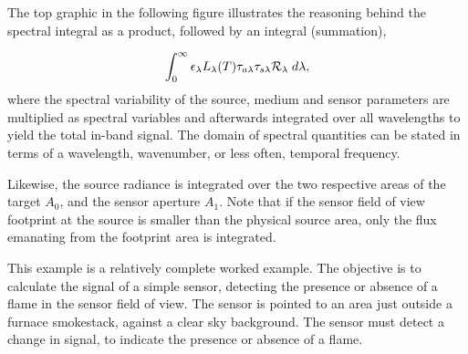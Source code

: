 \documentclass[a4paper,10pt,english]{sphinxmanual}
\begin{document}
The top graphic in the following figure illustrates the
reasoning behind the spectral integral as a product, followed by an integral (summation),

{\hfill{}\hfill}
\begin{gather}
\begin{split}\int_0^\infty
\epsilon_\lambda L_\lambda(T)\tau_{a\lambda}\tau_{s\lambda}{\cal R}_\lambda
\;d\lambda,\end{split}\notag
\end{gather}
where the spectral variability of the  source, medium and sensor parameters
are multiplied as spectral variables and afterwards integrated over all wavelengths
to yield the total in-band signal. The domain of spectral quantities can be
stated in terms of a wavelength, wavenumber, or less often, temporal frequency.

Likewise, the source radiance is integrated over the two respective areas of the
target \(A_0\), and the sensor aperture \(A_1\).  Note that if the
sensor field of  view footprint at the source is smaller than the physical
source area, only the flux emanating from the footprint area is integrated.

This example is a relatively complete worked example. The objective is to
calculate the signal of a simple sensor, detecting the presence or absence of
a flame in the sensor field of view. The sensor is pointed to an area just
outside a furnace smokestack, against a clear sky background. The sensor
must detect a change in signal, to indicate the presence or absence of a flame.
\end{document}
